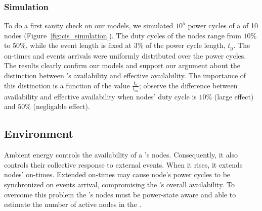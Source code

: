 \subsubsection{Simulation}
To do a first sanity check on our models, we simulated $10^5$ power cycles of a \sys of 10 nodes (Figure~\ref{fig:cis_simulation}). The duty cycles of the nodes range from $10\%$ to $50\%$, while the event length is fixed at $3\%$ of the power cycle length, $t_\text{p}$. The on-times and events arrivals were uniformly distributed over the power cycles. 
The results clearly confirm our models and support our argument about the distinction between \sys's availability and effective availability. The importance of this distinction is a function of the value $\frac{t_\text{e}}{t_\text{on}}$; observe the difference between availability and effective availability when nodes' duty cycle is $10\%$ (large effect) and $50\%$ (negligable effect).
%
%
\subsection{Environment}
Ambient energy controls the availability of a \sys's nodes.  Consequently, it also controls their collective response to external events. When it rises, it extends nodes' on-times. Extended on-times may cause node's power cycles to be synchronized on events arrival, compromising the \sys's overall availability. To overcome this problem the \sys's nodes must be power-state aware and able to estimate the number of active nodes in the \sys.
%

